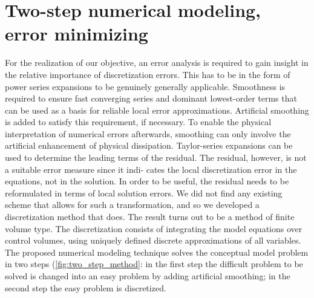\chapter{Two-step numerical modeling, error minimizing}\label{sec:error_minimizing}

For the realization of our objective, an error analysis is required to gain insight in the relative importance of discretization errors.
This has to be in the form of power series expansions to be genuinely generally applicable.
Smoothness is required to ensure fast converging series and dominant lowest-order terms that can be used as a basis for reliable local error approximations.
Artificial smoothing is added to satisfy this requirement, if necessary.
To enable the physical interpretation of numerical errors afterwards, smoothing can only involve the artificial enhancement of physical dissipation.
Taylor-series expansions can be used to determine the leading terms of the residual.
The residual, however, is not a suitable error measure since it indi-
cates the local discretization error in the equations, not in the solution. In order
to be useful, the residual needs to be reformulated in terms of local solution
errors.
We did not find any existing scheme that allows for such a transformation, and so we developed a discretization method that does.
The result turns out to be a method of finite volume type.
The discretization consists of integrating the model equations over control volumes, using uniquely defined discrete approximations of all variables.
The proposed numerical modeling technique solves the conceptual model problem in two steps (\autoref{fig:two_step_method}: in the first step the difficult problem to be solved is changed into an easy problem by adding artificial smoothing; in the second step the easy problem is discretized.

